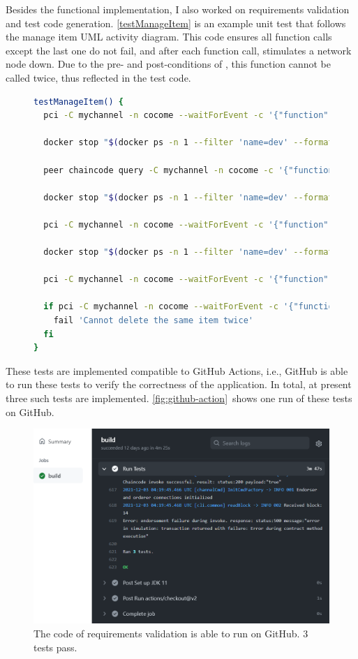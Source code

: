Besides the functional implementation, I also worked on requirements validation and test code generation. \autoref{testManageItem} is an example unit test that follows the manage item UML activity diagram. This code ensures all function calls except the last one do not fail, and after each function call,  stimulates a network node down. Due to the pre- and post-conditions of , this function cannot be called twice, thus reflected in the test code.


\begin{figure}[ht]
\begin{lstlisting}[language=bash, breaklines=true, showstringspaces=false, frame=tb, caption={A Bash function that tests operations in the manage item category}, label=testManageItem]
testManageItem() {
  pci -C mychannel -n cocome --waitForEvent -c '{"function":"ManageItemCRUDServiceImpl:createItem","Args":["1","cookies","10","10","9"]}' || fail

  docker stop "$(docker ps -n 1 --filter 'name=dev' --format '{{.ID}}')"

  peer chaincode query -C mychannel -n cocome -c '{"function":"ManageItemCRUDServiceImpl:queryItem","Args":["1"]}' || fail

  docker stop "$(docker ps -n 1 --filter 'name=dev' --format '{{.ID}}')"

  pci -C mychannel -n cocome --waitForEvent -c '{"function":"ManageItemCRUDServiceImpl:modifyItem","Args":["1","Pepperidge farm cookies","12","5","10"]}' || fail

  docker stop "$(docker ps -n 1 --filter 'name=dev' --format '{{.ID}}')"

  pci -C mychannel -n cocome --waitForEvent -c '{"function":"ManageItemCRUDServiceImpl:deleteItem","Args":["1"]}' || fail

  if pci -C mychannel -n cocome --waitForEvent -c '{"function":"ManageItemCRUDServiceImpl:deleteItem","Args":["1"]}'; then
    fail 'Cannot delete the same item twice'
  fi
}
\end{lstlisting}
\end{figure}

These tests are implemented compatible to GitHub Actions, i.e., GitHub is able to run these tests to verify the correctness of the application. In total, at present three such tests are implemented. \autoref{fig:github-action}~shows one run of these tests on GitHub.

\begin{figure}[ht]
\centering
\includegraphics[width=0.9\linewidth]{github-action}
\caption{The code of requirements validation is able to run on GitHub. 3 tests pass.}
\label{fig:github-action}
\end{figure}
